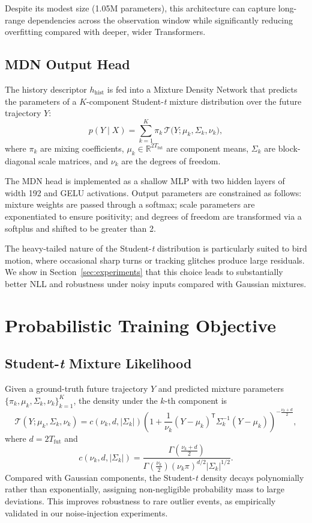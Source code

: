 \documentclass[journal]{IEEEtran}
\begin{document}
Despite its modest size (1.05M parameters), this architecture can capture long-range dependencies across the observation window while significantly reducing overfitting compared with deeper, wider Transformers.

\subsection{MDN Output Head}

The history descriptor $h_{\text{hist}}$ is fed into a Mixture Density Network \cite{Bishop1994MDN} that predicts the parameters of a $K$-component Student-\textit{t} mixture distribution over the future trajectory $Y$:
\[
p(Y \mid X) = \sum_{k=1}^{K} \pi_k \, \mathcal{T}\big(Y; \mu_k, \Sigma_k, \nu_k\big),
\]
where $\pi_k$ are mixing coefficients, $\mu_k \in \mathbb{R}^{2T_{\text{fut}}}$ are component means, $\Sigma_k$ are block-diagonal scale matrices, and $\nu_k$ are the degrees of freedom.

The MDN head is implemented as a shallow MLP with two hidden layers of width 192 and GELU activations. Output parameters are constrained as follows: mixture weights are passed through a softmax; scale parameters are exponentiated to ensure positivity; and degrees of freedom are transformed via a softplus and shifted to be greater than 2.

The heavy-tailed nature of the Student-\textit{t} distribution is particularly suited to bird motion, where occasional sharp turns or tracking glitches produce large residuals. We show in Section~\ref{sec:experiments} that this choice leads to substantially better NLL and robustness under noisy inputs compared with Gaussian mixtures.
\section{Probabilistic Training Objective}
\label{sec:prob_model}

\subsection{Student-\textit{t} Mixture Likelihood}

Given a ground-truth future trajectory $Y$ and predicted mixture parameters $\{\pi_k, \mu_k, \Sigma_k, \nu_k\}_{k=1}^{K}$, the density under the $k$-th component is
\begin{equation}
	\mathcal{T}(Y;\mu_k,\Sigma_k,\nu_k)
	= c(\nu_k,d,|\Sigma_k|)
	\left(1 + \frac{1}{\nu_k}(Y-\mu_k)^{\mathsf{T}}\Sigma_k^{-1}(Y-\mu_k)\right)^{-\frac{\nu_k+d}{2}},
	\label{eq:studentt}
\end{equation}
where $d = 2T_{\text{fut}}$ and
\begin{equation}
	c(\nu_k,d,|\Sigma_k|)
	= \frac{\Gamma\left(\frac{\nu_k + d}{2}\right)}
	{\Gamma\left(\frac{\nu_k}{2}\right) (\nu_k \pi)^{d/2} |\Sigma_k|^{1/2}}.
\end{equation}
Compared with Gaussian components, the Student-\textit{t} density decays polynomially rather than exponentially, assigning non-negligible probability mass to large deviations. This improves robustness to rare outlier events, as empirically validated in our noise-injection experiments.
\end{document}
